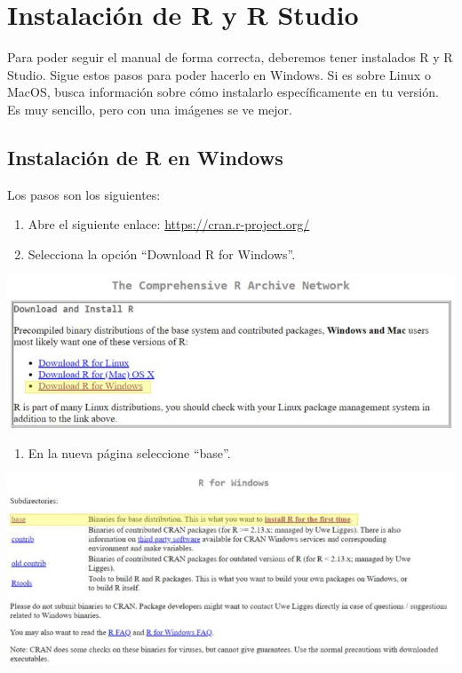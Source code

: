 \documentclass[
]{book}
\providecommand{\tightlist}{%
  \setlength{\itemsep}{0pt}\setlength{\parskip}{0pt}}
\begin{document}
\hypertarget{instalaciuxf3n-de-r-y-r-studio}{%
\section{Instalación de R y R Studio}\label{instalaciuxf3n-de-r-y-r-studio}}

Para poder seguir el manual de forma correcta, deberemos tener instalados R y R Studio. Sigue estos pasos para poder hacerlo en Windows. Si es sobre Linux o MacOS, busca información sobre cómo instalarlo específicamente en tu versión. Es muy sencillo, pero con una imágenes se ve mejor.

\hypertarget{instalaciuxf3n-de-r-en-windows}{%
\subsection{Instalación de R en Windows}\label{instalaciuxf3n-de-r-en-windows}}

Los pasos son los siguientes:

\begin{enumerate}
\def\labelenumi{\arabic{enumi}.}
\item
  Abre el siguiente enlace: \url{https://cran.r-project.org/}
\item
  Selecciona la opción ``Download R for Windows''.
\end{enumerate}

\includegraphics{data/01.png}

\begin{enumerate}
\def\labelenumi{\arabic{enumi}.}
\setcounter{enumi}{2}
\tightlist
\item
  En la nueva página seleccione ``base''.
\end{enumerate}

\includegraphics{data/02.png}
\end{document}
